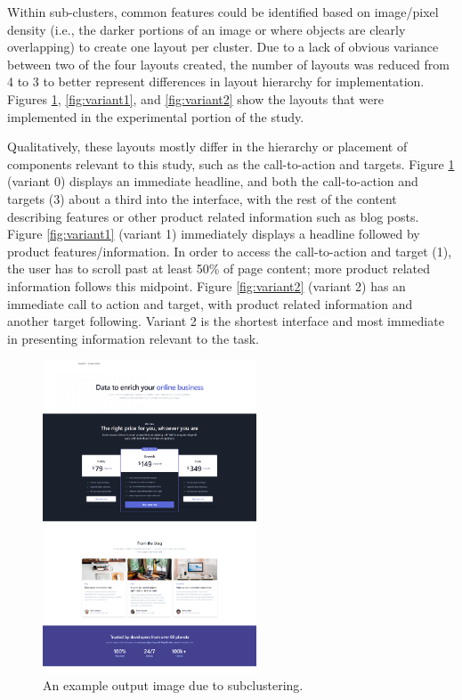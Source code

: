 \documentclass[conference]{IEEEtran}
\begin{document}
Within sub-clusters, common features could be identified based on image/pixel density (i.e., the darker portions of an image or where objects are clearly overlapping) to create one layout per cluster. Due to a lack of obvious variance between two of the four layouts created, the number of layouts was reduced from 4 to 3 to better represent differences in layout hierarchy for implementation. Figures \ref{fig:variant0}, \ref{fig:variant1}, and \ref{fig:variant2} show the layouts that were implemented in the experimental portion of the study.

Qualitatively, these layouts mostly differ in the hierarchy or placement of components relevant to this study, such as the call-to-action and targets. Figure \ref{fig:variant0} (variant 0) displays an immediate headline, and both the call-to-action and targets (3) about a third into the interface, with the rest of the content describing features or other product related information such as blog posts. Figure \ref{fig:variant1} (variant 1) immediately displays a headline followed by product features/information. In order to access the call-to-action and target (1), the user has to scroll past at least 50\% of page content; more product related information follows this midpoint. Figure \ref{fig:variant2} (variant 2) has an immediate call to action and target, with product related information and another target following. Variant 2 is the shortest interface and most immediate in presenting information relevant to the task.

\begin{figure}[h]
\centering
\label{fig:variant0}
\includegraphics[width=2.5in]{media/8nqXhdl3JD8u.png}
\caption{An example output image due to subclustering.}
\end{figure}
\end{document}
